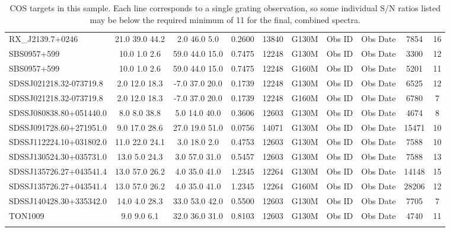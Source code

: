 \documentclass[iop]{emulateapj-rtx4}
\begin{document}
\begin{table}[ht]
\begin{center}
\begin{tabular}{l c c c c c c c c c}
RX\_J2139.7+0246  &         21.0  39.0  44.2  &   2.0  46.0  5.0  &      0.2600  & 13840  &   G130M  &   Obs ID  & Obs Date  & 7854  &       16         \\
SBS0957+599  &             10.0  1.0  2.6  &     59.0  44.0  15.0  &    0.7475  & 12248  &   G130M  &   Obs ID  & Obs Date  & 3300  &       12         \\
SBS0957+599  &             10.0  1.0  2.6  &     59.0  44.0  15.0  &    0.7475  & 12248  &   G160M  &   Obs ID  & Obs Date  & 5201  &       11         \\
SDSSJ021218.32-073719.8  & 2.0  12.0  18.3  &    -7.0  37.0  20.0  &    0.1739  & 12248  &   G130M  &   Obs ID  & Obs Date  & 6525  &       12         \\
SDSSJ021218.32-073719.8  & 2.0  12.0  18.3  &    -7.0  37.0  20.0  &    0.1739  & 12248  &   G160M  &   Obs ID  & Obs Date  & 6780  &       7          \\
SDSSJ080838.80+051440.0  & 8.0  8.0  38.8  &     5.0  14.0  40.0  &     0.3606  & 12603  &   G130M  &   Obs ID  & Obs Date  & 4674  &       8          \\
SDSSJ091728.60+271951.0  & 9.0  17.0  28.6  &    27.0  19.0  51.0  &    0.0756  & 14071  &   G130M  &   Obs ID  & Obs Date  & 15471  &      10         \\
SDSSJ112224.10+031802.0  & 11.0  22.0  24.1  &   3.0  18.0  2.0  &      0.4753  & 12603  &   G130M  &   Obs ID  & Obs Date  & 7588  &       10         \\
SDSSJ130524.30+035731.0  & 13.0  5.0  24.3  &    3.0  57.0  31.0  &     0.5457  & 12603  &   G130M  &   Obs ID  & Obs Date  & 7588  &       13         \\
SDSSJ135726.27+043541.4  & 13.0  57.0  26.2  &   4.0  35.0  41.0  &     1.2345  & 12264  &   G130M  &   Obs ID  & Obs Date  & 14148  &      15         \\
SDSSJ135726.27+043541.4  & 13.0  57.0  26.2  &   4.0  35.0  41.0  &     1.2345  & 12264  &   G160M  &   Obs ID  & Obs Date  & 28206  &      12         \\
SDSSJ140428.30+335342.0  & 14.0  4.0  28.3  &    33.0  53.0  42.0  &    0.5500  & 12603  &   G130M  &   Obs ID  & Obs Date  & 7705  &       7          \\
TON1009  			       &  9.0  9.0  6.1  &      32.0  36.0  31.0  &    0.8103  & 12603  &   G130M  &   Obs ID  & Obs Date  & 4740  &       11         \\

 \\
\hline

\end{tabular}
\end{center}
  \caption{\small{COS targets in this sample. Each line corresponds to a single grating observation, so some individual S/N ratios listed may be below the required minimum of 11 for the final, combined spectra.}}
  \label{target_table}
\end{table}
\end{document}
